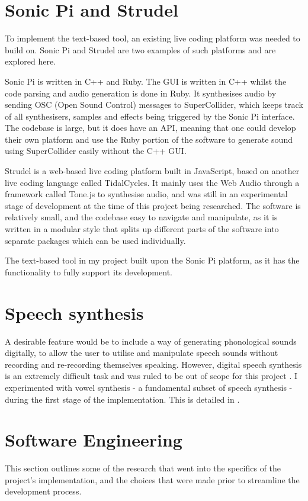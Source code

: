 \documentclass[12pt,a4paper,oneside,openright]{report}
\begin{document}
\section{Sonic Pi and Strudel}
To implement the text-based tool, an existing live coding platform was needed to build on. Sonic Pi and Strudel are two examples of such platforms and are explored here.

Sonic Pi is written in C++ and Ruby. The GUI is written in C++ whilst the code parsing and audio generation is done in Ruby. It synthesises audio by sending OSC (Open Sound Control) messages to SuperCollider, which keeps track of all synthesisers, samples and effects being triggered by the Sonic Pi interface. The codebase is large, but it does have an API, meaning that one could develop their own platform and use the Ruby portion of the software to generate sound using SuperCollider easily without the C++ GUI.

Strudel is a web-based live coding platform built in JavaScript, based on another live coding language called TidalCycles. It mainly uses the Web Audio through a framework called Tone.js to synthesise audio, and was still in an experimental stage of development at the time of this project being researched. The software is relatively small, and the codebase easy to navigate and manipulate, as it is written in a modular style that splits up different parts of the software into separate packages which can be used individually.

The text-based tool in my project built upon the Sonic Pi platform, as it has the functionality to fully support its development.

\section{Speech synthesis}
A desirable feature would be to include a way of generating phonological sounds digitally, to allow the user to utilise and manipulate speech sounds without recording and re-recording themselves speaking. However, digital speech synthesis is an extremely difficult task and was ruled to be out of scope for this project \cite{Balyan13}. I experimented with vowel synthesis - a fundamental subset of speech synthesis - during the first stage of the implementation. This is detailed in .

\section{Software Engineering}
This section outlines some of the research that went into the specifics of the project's implementation, and the choices that were made prior to streamline the development process.
\end{document}
